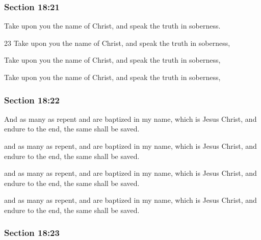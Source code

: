 	\subsubsection{Section 18:21} %
		\label{DC18-21}

		Take upon you the name of Christ, and speak the truth in soberness.

		\begin{framed}
		\scriptsize
			\begin{compactdesc}
				\item[JSP] 23 Take upon you the name of Christ, and speak the truth in soberness, 
				\item[DC 1835] Take upon you the name of Christ, and speak the truth in soberness, 
				\item[DC 1844] Take upon you the name of Christ, and speak the truth in soberness, 
			\end{compactdesc}
		\end{framed}

	\subsubsection{Section 18:22} %
		\label{DC18-22}

		And as many as repent and are baptized in my name, which is Jesus Christ, and endure to the end, the same shall be saved.

		\begin{framed}
		\scriptsize
			\begin{compactdesc}
				\item[JSP] and as many as repent, and are baptized in my name, which is Jesus Christ, and endure to the end, the same shall be saved.
				\item[DC 1835] and as many as repent, and are baptized in my name, which is Jesus Christ, and endure to the end, the same shall be saved. 
				\item[DC 1844] and as many as repent, and are baptized in my name, which is Jesus Christ, and endure to the end, the same shall be saved. 
			\end{compactdesc}
		\end{framed}

	\subsubsection{Section 18:23} %
		\label{DC18-23}

